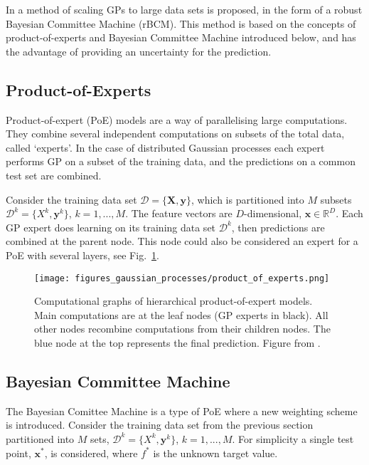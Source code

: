 \documentclass[twoside,english]{uiofysmaster}
\begin{document}
{In \cite{deisenroth2015distributed} a method of scaling GPs to large data sets is proposed, in the form of a robust Bayesian Committee Machine (rBCM). This method is based on the concepts of product-of-experts and Bayesian Committee Machine introduced below, and has the advantage of providing an uncertainty for the prediction.


\subsection{Product-of-Experts}

Product-of-expert (PoE) models are a way of parallelising large computations. They combine several independent computations on subsets of the total data, called `experts'. In the case of distributed Gaussian processes each expert performs GP on a subset of the training data, and the predictions on a common test set are combined. 

Consider the training data set $\mathcal{D} = \{ \textbf{X}, \textbf{y}\}$, which is partitioned into $M$ subsets $\mathcal{D}^k = \{X^k, \textbf{y}^k \}$, $k = 1,...,M$. The feature vectors are $D$-dimensional, $\textbf{x} \in \mathbb{R}^D$. Each GP expert does learning on its training data set $\mathcal{D}^k$, then predictions are combined at the parent node. This node could also be considered an expert for a PoE with several layers, see Fig.~\ref{Fig:: gaussian process : DGP illustration of layers}. 

\begin{figure}
\texttt{[image: figures\_gaussian\_processes/product\_of\_experts.png]}
\caption{Computational graphs of hierarchical product-of-expert models. Main computations are at the leaf nodes (GP experts in black). All other nodes recombine computations from their children nodes. The blue node at the top represents the final prediction. Figure from \cite{deisenroth2015distributed}.}
\label{Fig:: gaussian process : DGP illustration of layers}
\end{figure}

\subsection{Bayesian Committee Machine}

The Bayesian Comittee Machine \cite{tresp2000bayesian} is a type of PoE where a new weighting scheme is introduced. Consider the training data set from the previous section partitioned into $M$ sets, $\mathcal{D}^k = \{X^k, \textbf{y}^k \}$, $k = 1,...,M$. For simplicity a single test point, $\textbf{x}^*$, is considered, where $f^*$ is the unknown target value.

}
\end{document}
